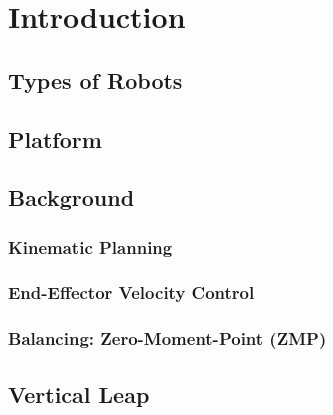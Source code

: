 \section{Introduction}
	
	\subsection{Types of Robots}
		
	\subsection{Platform}
		
	\subsection{Background}
		\subsubsection{Kinematic Planning}
			
		\subsubsection{End-Effector Velocity Control}
			
%			
		\subsubsection{Balancing: Zero-Moment-Point (ZMP)}
			
	\subsection{Vertical Leap}
		

%
%
%
%
%
%

%
%
%

%
%
%
